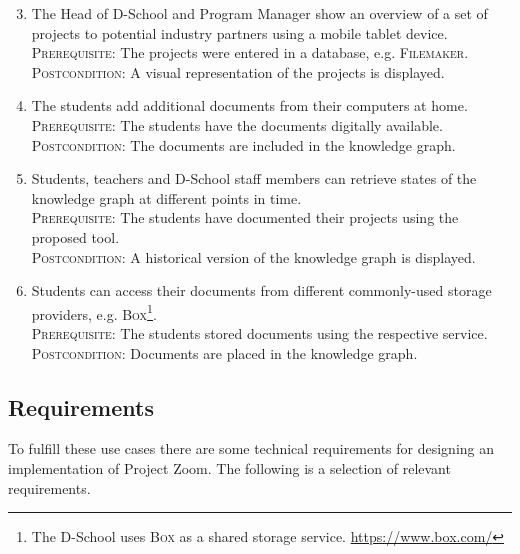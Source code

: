 \begin{enumerate}
\setcounter{enumi}{2}

\item The Head of D-School and Program Manager show an overview of a set of projects to potential industry partners using a mobile tablet device.\\
\textsc{Prerequisite}: The projects were entered in a database, e.g. \textsc{Filemaker}.\\
\textsc{Postcondition}: A visual representation of the projects is displayed. \label{uc:3}

\item The students add additional documents from their computers at home.\\
\textsc{Prerequisite}: The students have the documents digitally available.\\
\textsc{Postcondition}: The documents are included in the knowledge graph. \label{uc:4}

\item Students, teachers and D-School staff members can retrieve states of the knowledge graph at different points in time.\\
\textsc{Prerequisite}: The students have documented their projects using the proposed tool.\\
\textsc{Postcondition}: A historical version of the knowledge graph is displayed.  \label{uc:5}

\item Students can access their documents from different commonly-used storage providers, e.g. \textsc{Box}\footnote{The D-School uses \textsc{Box} as a shared storage service. \url{https://www.box.com/}}.\\
\textsc{Prerequisite}: The students stored documents using the respective service.\\
\textsc{Postcondition}: Documents are placed in the knowledge graph.  \label{uc:6}
\end{enumerate}

\subsection{Requirements}

To fulfill these use cases there are some technical requirements for designing an implementation of Project Zoom. The following is a selection of relevant requirements.

